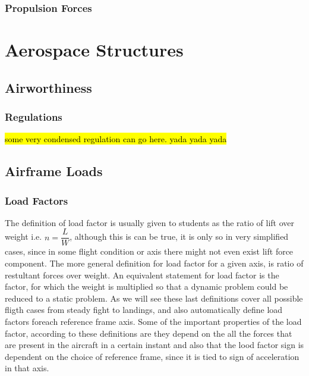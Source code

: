\subsection{Propulsion Forces}














\chapter{Aerospace Structures}

\newpage
\section{Airworthiness}


\subsection{Regulations}
\hl{some very condensed regulation can go here. yada yada yada}


\newpage
\section{Airframe Loads}



\subsection{Load Factors}
The definition of load factor is usually given to students as the ratio of lift over weight i.e. $n= \dfrac{L}{W}$, although this is can be true,
it is only so in very simplified cases, since in some flight condition or axis there might not even exist lift force component.
The more general definition for load factor for a given axis, is ratio of restultant forces over weight.
An equivalent statement for load factor is the factor, for which the weight is multiplied so that a dynamic problem could be reduced to a static problem.
As we will see these last definitions cover all possible fligth cases from steady fight to landings, and also automatically define load factors
foreach reference frame axis.
Some of the important properties of the load factor, according to these definitions are they depend on the all the forces that are present
in the aircraft in a certain instant and also that the lood factor sign is dependent on the choice of reference frame, since it is tied to
sign of acceleration in that axis.

